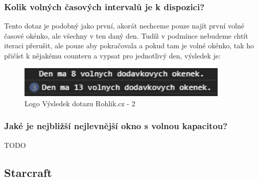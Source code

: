 \documentclass[a4, titlepage]{article}
\begin{document}
\subsubsection{Kolik volných časových intervalů je k dispozici?}
Tento dotaz je podobný jako první, akorát nechceme pouze najít první volné časové okénko, ale všechny v ten daný den. Tudíž v podmínce nebudeme chtít iteraci přerušit, ale pouze aby pokračovala a pokud tam je volné okénko, tak ho přičíst k nějakému counteru a vypsat pro jednotlivý den, výsledek je: 
\begin{figure}[h]
    \centering
    \includegraphics[width=10cm]{R2}
    \caption{Logo Výsledek dotazu Rohlik.cz - 2}
\end{figure}

\subsubsection{Jaké je nejbližší nejlevnější okno s volnou kapacitou?}
TODO

\subsection{Starcraft}
\end{document}
